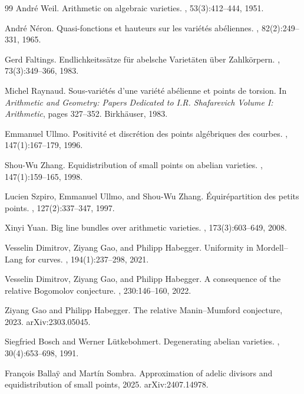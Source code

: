 \documentclass[10pt,a4paper]{amsart}
\theoremstyle{plain}
\theoremstyle{plain}
\numberwithin{equation}{section}
\begin{document}
\begin{thebibliography}{99}
		Andr{\'e} Weil.
		\newblock Arithmetic on algebraic varieties.
		, 53(3):412--444, 1951.
		
		Andr{\'e} N{\'e}ron.
		\newblock Quasi-fonctions et hauteurs sur les vari\'et\'es ab\'eliennes.
		, 82(2):249--331, 1965.
		
		Gerd Faltings.
		\newblock Endlichkeitss{\"a}tze f{\"u}r abelsche Variet{\"a}ten {\"u}ber Zahlk{\"o}rpern.
		, 73(3):349--366, 1983.
		
		Michel Raynaud.
		\newblock Sous-vari\'et\'es d'une vari\'et\'e ab\'elienne et points de torsion.
		\newblock In {\em Arithmetic and Geometry: Papers Dedicated to I.R. Shafarevich Volume I: Arithmetic}, pages 327--352. Birkh{\"a}user, 1983.
		
		Emmanuel Ullmo.
		\newblock Positivit\'e et discr\'etion des points alg\'ebriques des courbes.
		, 147(1):167--179, 1996.
		
		Shou-Wu Zhang.
		\newblock Equidistribution of small points on abelian varieties.
		, 147(1):159--165, 1998.
		
		Lucien Szpiro, Emmanuel Ullmo, and Shou-Wu Zhang.
		\newblock \'Equir\'epartition des petits points.
		, 127(2):337--347, 1997.
		
		Xinyi Yuan.
		\newblock Big line bundles over arithmetic varieties.
		, 173(3):603--649, 2008.
		
		Vesselin Dimitrov, Ziyang Gao, and Philipp Habegger.
		\newblock Uniformity in Mordell--Lang for curves.
		, 194(1):237--298, 2021.
		
		Vesselin Dimitrov, Ziyang Gao, and Philipp Habegger.
		\newblock A consequence of the relative Bogomolov conjecture.
		, 230:146--160, 2022.
		
		Ziyang Gao and Philipp Habegger.
		\newblock The relative Manin--Mumford conjecture, 2023.
		\newblock arXiv:2303.05045.
		
		Siegfried Bosch and Werner L{\"u}tkebohmert.
		\newblock Degenerating abelian varieties.
		, 30(4):653--698, 1991.
		
		Fran{\c c}ois Balla{\"y} and Mart\'in Sombra.
		\newblock Approximation of adelic divisors and equidistribution of small points, 2025.
		\newblock arXiv:2407.14978.
		

\end{thebibliography}
\end{document}
